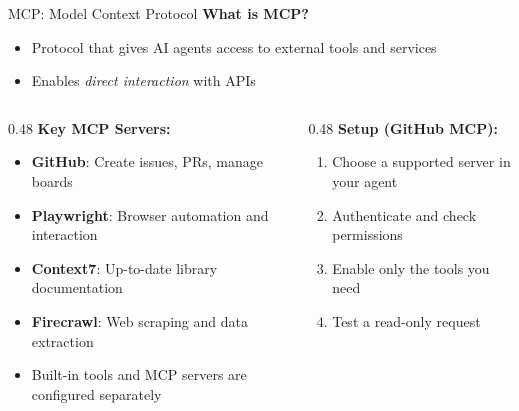 \documentclass[11pt,aspectratio=169]{beamer}
\begin{document}
\begin{frame}{MCP: Model Context Protocol}
\textbf{What is MCP?}
\begin{itemize}
    \item Protocol that gives AI agents access to external tools and services
    \item Enables \textit{direct interaction} with APIs
\end{itemize}

\vspace{0.5cm}

\begin{columns}
\begin{column}{0.48\textwidth}
\textbf{Key MCP Servers:}
\scriptsize
\begin{itemize}
    \item \textbf{GitHub}: Create issues, PRs, manage boards
    \item \textbf{Playwright}: Browser automation and interaction
    \item \textbf{Context7}: Up-to-date library documentation
    \item \textbf{Firecrawl}: Web scraping and data extraction
    \item Built-in tools and MCP servers are configured separately
\end{itemize}

\end{column}

\begin{column}{0.48\textwidth}
\textbf{Setup (GitHub MCP):}
\scriptsize
\begin{enumerate}
    \item Choose a supported server in your agent
    \item Authenticate and check permissions
    \item Enable only the tools you need
    \item Test a read-only request
\end{enumerate}
\end{column}
\end{columns}
\end{frame}
\end{document}
